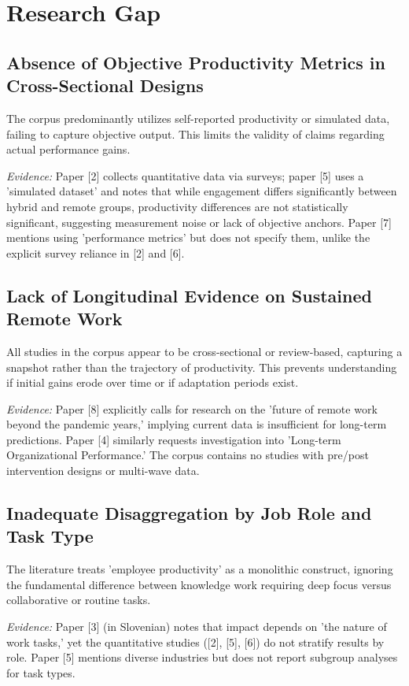 \documentclass[conference]{IEEEtran}
\begin{document}
\section{Research Gap}
\subsection{Absence of Objective Productivity Metrics in Cross-Sectional Designs}
The corpus predominantly utilizes self-reported productivity or simulated data, failing to capture objective output. This limits the validity of claims regarding actual performance gains.

\textit{Evidence:} Paper [2] collects quantitative data via surveys; paper [5] uses a 'simulated dataset' and notes that while engagement differs significantly between hybrid and remote groups, productivity differences are not statistically significant, suggesting measurement noise or lack of objective anchors. Paper [7] mentions using 'performance metrics' but does not specify them, unlike the explicit survey reliance in [2] and [6].

\subsection{Lack of Longitudinal Evidence on Sustained Remote Work}
All studies in the corpus appear to be cross-sectional or review-based, capturing a snapshot rather than the trajectory of productivity. This prevents understanding if initial gains erode over time or if adaptation periods exist.

\textit{Evidence:} Paper [8] explicitly calls for research on the 'future of remote work beyond the pandemic years,' implying current data is insufficient for long-term predictions. Paper [4] similarly requests investigation into 'Long-term Organizational Performance.' The corpus contains no studies with pre/post intervention designs or multi-wave data.

\subsection{Inadequate Disaggregation by Job Role and Task Type}
The literature treats 'employee productivity' as a monolithic construct, ignoring the fundamental difference between knowledge work requiring deep focus versus collaborative or routine tasks.

\textit{Evidence:} Paper [3] (in Slovenian) notes that impact depends on 'the nature of work tasks,' yet the quantitative studies ([2], [5], [6]) do not stratify results by role. Paper [5] mentions diverse industries but does not report subgroup analyses for task types.
\end{document}
